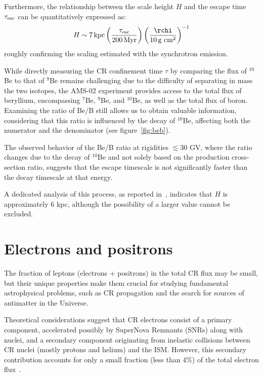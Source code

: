Furthermore, the relationship between the scale height $H$ and the escape time $\tau_{\rm esc}$ can be quantitatively expressed as:
%
\begin{equation}
H \sim 7 \, \text{kpc} \left(\frac{\tau_{\rm esc}}{200 \, \text{Myr}}\right) \left(\frac{\rchi}{10 \, \text{g cm}^2}\right)^{-1}
\end{equation}
%
roughly confirming the scaling estimated with the synchrotron emission.

While directly measuring the CR confinement time $\tau$ by comparing the flux of $^{10}$Be to that of $^9$Be remains challenging due to the difficulty of separating in mass the two isotopes, the AMS-02 experiment provides access to the total flux of beryllium, encompassing $^7$Be, $^9$Be, and $^{10}$Be, as well as the total flux of boron.
%
Examining the ratio of Be/B still allows us to obtain valuable information, considering that this ratio is influenced by the decay of $^{10}$Be, affecting both the numerator and the denominator (see figure~\ref{fig:beb}).

The observed behavior of the Be/B ratio at rigidities $\lesssim 30$ GV, where the ratio changes due to the decay of $^{10}$Be and not solely based on the production cross-section ratio, suggests that the escape timescale is not significantly faster than the decay timescale at that energy.

A dedicated analysis of this process, as reported in~\cite{Evoli2020prd,Weinrich2020aab,Maurin2022aa}, indicates that $H$ is approximately 6 kpc, although the possibility of a larger value cannot be excluded.

\section{Electrons and positrons}
\label{sec:leptons}

The fraction of leptons (electrons + positrons) in the total CR flux may be small, but their unique properties make them crucial for studying fundamental astrophysical problems, such as CR propagation and the search for sources of antimatter in the Universe.

Theoretical considerations suggest that CR electrons consist of a primary component, accelerated possibly by SuperNova Remnants (SNRs) along with nuclei, and a secondary component originating from inelastic collisions between CR nuclei (mostly protons and helium) and the ISM. However, this secondary contribution accounts for only a small fraction (less than 4\%) of the total electron flux~\cite{Moskalenko1998apj,Delahaye2010aa,Evoli2021prd}.

